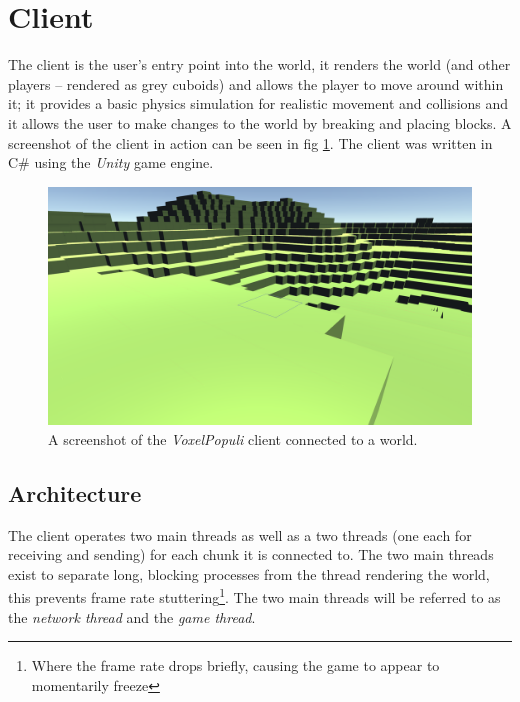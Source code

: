 \documentclass[10pt,twoside,notitlepage,a4paper]{report}
\newcommand{\unity}{\emph{Unity}}
\newcommand{\voxpop}{\emph{VoxelPopuli}}
\begin{document}
	\section{Client}
	\label{sec:client}
	The client is the user's entry point into the world, it renders the world (and other players -- rendered as grey cuboids) and allows the player to move around within it; it provides a basic physics simulation for realistic movement and collisions and it allows the user to make changes to the world by breaking and placing blocks. A screenshot of the client in action can be seen in fig \ref{fig:client}. The client was written in C\# using the \unity{} game engine.
	
	\begin{figure}
		\includegraphics[width=\textwidth]{client.png}
		\caption{A screenshot of the \voxpop{} client connected to a world.}
		\label{fig:client}
	\end{figure}
	
	\subsection{Architecture} %
	The client operates two main threads as well as a two threads (one each for receiving and sending) for each chunk it is connected to. The two main threads exist to separate long, blocking processes from the thread rendering the world, this prevents frame rate stuttering\footnote{Where the frame rate drops briefly, causing the game to appear to momentarily freeze}. The two main threads will be referred to as the \emph{network thread} and the \emph{game thread}.
	
\end{document}
